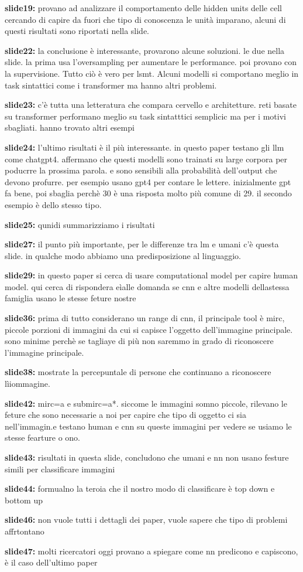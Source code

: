 \textbf{slide19:} provano ad analizzare il comportamento delle hidden units delle cell cercando di capire
da fuori che tipo di conoscenza le unità imparano, alcuni di questi risultati sono riportati nella slide.

\textbf{slide22:} la conclusione è interessante, provarono alcune soluzioni. le due nella slide. la prima
usa l'oversampling per aumentare le performance. poi provano con la supervisione.
Tutto ciò è vero per lsmt. Alcuni modelli si comportano meglio in task sintattici come i transformer ma
hanno altri problemi.

\textbf{slide23:} c'è tutta una letteratura che compara cervello e architetture. reti basate su transformer
performano meglio su task sintatttici semplicic ma per i motivi sbagliati. hanno trovato altri esempi

\textbf{slide24:} l'ultimo risultati è il più interessante. in questo paper testano gli llm come chatgpt4.
affermano che questi modelli sono trainati su large corpora per poducrre la prossima parola. e sono sensibili
alla probabilità dell'output che devono profurre. per esempio usano gpt4 per contare le lettere. inizialmente
gpt fa bene, poi sbaglia perchè 30 è una risposta molto più comune di 29. il secondo esempio è dello stesso
tipo. 

\textbf{slide25:} qunidi summarizziamo i risultati

\textbf{slide27:} il punto più importante, per le differenze tra lm e umani c'è questa slide. in qualche
modo abbiamo una predisposizione al linguaggio. 

\textbf{slide29:} in questo paper si cerca di usare computational model per capire human model. qui 
cerca di rispondera eìalle domanda se cnn e altre modelli dellastessa famiglia usano le stesse feture nostre

\textbf{slide36:} prima di tutto considerano un range di cnn, il principale tool è mirc, piccole porzioni
di immagini da cui si capisce l'oggetto dell'immagine principale. sono minime perchè se tagliaye di più non
saremmo in grado di riconoscere l'immagine principale. 

\textbf{slide38:} mostrate la percepuntale di persone che continuano a riconoscere lìiommagine.

\textbf{slide42:} mirc=a e submirc=a*. siccome le immagini somno piccole, rilevano le feture che sono
necessarie a noi per capire che tipo di oggetto ci sia nell'immagin.e testano human e cnn su queste immagini
per vedere se usiamo le stesse fearture o ono. 

\textbf{slide43:} risultati in questa slide, concludono che umani e nn non usano festure simili per 
classificare immagini

\textbf{slide44:} formualno la teroia che il nostro modo di classificare è top down e bottom up

\textbf{slide46:} non vuole tutti i dettagli dei paper, vuole sapere che tipo di problemi affrtontano

\textbf{slide47:} molti ricercatori oggi provano a spiegare come nn predicono e capiscono, 
è il caso dell'ultimo paper
